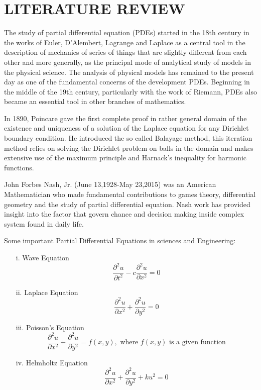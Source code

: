 \documentclass[12pt]{report}
\begin{document}
\section{LITERATURE REVIEW}
\qquad The study of partial differential equation (PDEs) started in the 18th century in the works of Euler, D'Alembert, Lagrange and Laplace as a central tool in the description of mechanics of series of  things that are slightly different from each other and more generally, as the principal mode of analytical study of models in the physical science. The analysis of physical models has remained to the present day as one of the fundamental concerns of the development PDEs. Beginning in the middle of the 19th century, particularly with the work of Riemann, PDEs also became an essential tool in other branches of mathematics. \\
\par In 1890, Poincare gave the first complete proof in rather general domain of the existence and uniqueness of a solution of the Laplace equation for any Dirichlet boundary condition. He introduced the so called Balayage method, this iteration method relies on solving the Dirichlet problem on balls in the domain and makes extensive use of the maximum principle and Harnack's inequality for harmonic functions. \\
\par John Forbes Nash, Jr. (June 13,1928-May 23,2015) was an American Mathematician who made fundamental contributions to games theory, differential geometry and the study of partial differential equation. Nash work has provided insight into the factor that govern chance and decision making inside complex system found in daily life. \\
\par Some important Partial Differential Equations in sciences and Engineering:
\begin{enumerate}
	\item[i.] Wave Equation
  \begin{equation*}
  \frac{\partial ^2 u}{\partial t^2}-c \frac{\partial^2u}{\partial x^2}=0
  \end{equation*}
  \item[ii.] Laplace Equation
  \begin{equation*}
  \frac{\partial^2 u}{\partial x^2}+\frac{\partial^2 u}{\partial y^2}=0
  \end{equation*}
  \item[iii.] Poisson's Equation
  \begin{equation*}
  \frac{\partial^2 u}{\partial x^2}+\frac{\partial^2 u}{\partial y^2}=f(x,y), \mbox{ where } f(x,y) \mbox{ is a given function}
  \end{equation*}
  \item[iv.] Helmholtz Equation
  \begin{equation*}
  \frac{\partial^2 u}{\partial x^2}+\frac{\partial^2 u}{\partial y^2}+ku^2=0
  \end{equation*}
  \end{enumerate}
\end{document}
